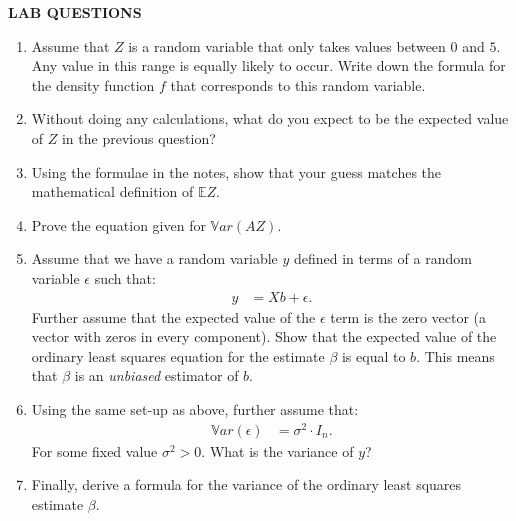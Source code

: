 \documentclass[12pt,hidelinks]{article}
\numberwithin{equation}{section}
\begin{document}
\newpage

\textbf{LAB QUESTIONS}

\vspace*{0pt}

\begin{enumerate}
\item Assume that $Z$ is a random variable that only takes values between $0$
and $5$. Any value in this range is equally likely to occur. Write down the
formula for the density function $f$ that corresponds to this random variable.
\item Without doing any calculations, what do you expect to be the expected
value of $Z$ in the previous question?
\item Using the formulae in the notes, show that your guess matches the mathematical
definition of $\mathbb{E}Z$.
\item Prove the equation given for $\mathbb{V}ar(AZ)$.
\item Assume that we have a random variable $y$ defined in terms of a random
variable $\epsilon$ such that:
\begin{align}
y &= X b + \epsilon.
\end{align}
Further assume that the expected value of the $\epsilon$ term is the zero vector
(a vector with zeros in every component). Show that the expected value of the
ordinary least squares equation for the estimate $\beta$ is equal to $b$.
This means that $\beta$ is an \textit{unbiased} estimator of $b$.
\item Using the same set-up as above, further assume that:
\begin{align}
\mathbb{V}ar(\epsilon) &= \sigma^2 \cdot I_n.
\end{align}
For some fixed value $\sigma^2 > 0$. What is the variance of $y$?
\item Finally, derive a formula for the variance of the ordinary least squares estimate $\beta$.
\end{enumerate}
\end{document}
